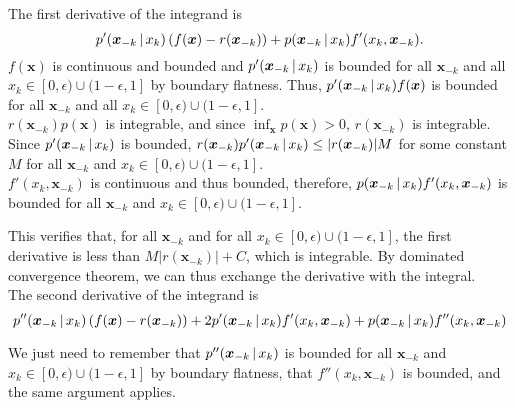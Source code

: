 \documentclass[12pt,pdftex,aos,noinfoline,addressasfootnote]{imsart}
\begin{document}
 The first derivative of the integrand is 
$$
p'(\mbox{\boldmath $x$}_{-k} {\,|\,} x_k)\left( f(\mbox{\boldmath $x$}) - r(\mbox{\boldmath $x$}_{-k}) \right) + p(\mbox{\boldmath $x$}_{-k} {\,|\,} x_k) f'(x_k, \mbox{\boldmath $x$}_{-k}).
$$
$f(\mathbf{x})$ is continuous and bounded and $p'(\mbox{\boldmath $x$}_{-k} {\,|\,} x_k)$ is bounded for all $\mathbf{x}_{-k}$ and all $x_k \in [0,\epsilon) \cup (1-\epsilon, 1]$ by boundary flatness. Thus, $p'(\mbox{\boldmath $x$}_{-k} {\,|\,} x_k) f(\mbox{\boldmath $x$})$ is bounded for all $\mathbf{x}_{-k}$ and all $x_k \in [0,\epsilon) \cup (1-\epsilon, 1]$.\\

$r(\mathbf{x}_{-k}) p(\mathbf{x})$ is integrable, and since $\inf_{\mathbf{x}} p(\mathbf{x}) > 0$, $r(\mathbf{x}_{-k})$ is integrable. Since $p'(\mbox{\boldmath $x$}_{-k} {\,|\,} x_k)$ is bounded, $r(\mbox{\boldmath $x$}_{-k}) p'(\mbox{\boldmath $x$}_{-k} {\,|\,} x_k) \leq |r(\mbox{\boldmath $x$}_{-k})|M$ for some constant $M$ for all $\mathbf{x}_{-k}$ and $x_k \in [0, \epsilon) \cup (1-\epsilon, 1]$. \\

$f'(x_k, \mathbf{x}_{-k})$ is continuous and thus bounded, therefore, $p(\mbox{\boldmath $x$}_{-k} {\,|\,} x_k) f'(x_k, \mbox{\boldmath $x$}_{-k})$ is bounded for all $\mathbf{x}_{-k}$ and $x_k \in [0, \epsilon) \cup (1-\epsilon, 1]$. 

This verifies that, for all $\mathbf{x}_{-k}$ and for all $x_k \in [0, \epsilon) \cup (1-\epsilon, 1]$, the first derivative is less than $M |r(\mathbf{x}_{-k})| + C$, which is integrable. By dominated convergence theorem, we can thus exchange the derivative with the integral. \\

The second derivative of the integrand is 
$$
p''(\mbox{\boldmath $x$}_{-k} {\,|\,} x_k) \left( f(\mbox{\boldmath $x$}) - r(\mbox{\boldmath $x$}_{-k}) \right) + 
  2 p'(\mbox{\boldmath $x$}_{-k} {\,|\,} x_k) f'(x_k, \mbox{\boldmath $x$}_{-k}) + p(\mbox{\boldmath $x$}_{-k} {\,|\,} x_k) f''(x_k, \mbox{\boldmath $x$}_{-k})
$$

We just need to remember that $p''(\mbox{\boldmath $x$}_{-k} {\,|\,} x_k)$ is bounded for all $\mathbf{x}_{-k}$ and $x_k \in [0, \epsilon) \cup (1-\epsilon, 1]$ by boundary flatness, that $f''(x_k, \mathbf{x}_{-k})$ is bounded, and the same argument applies.



\end{document}
